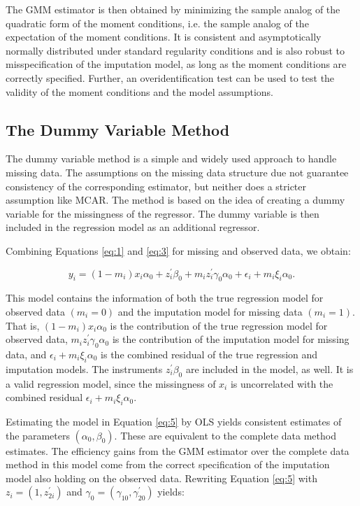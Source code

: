 The GMM estimator is then obtained by minimizing the sample analog of the quadratic form of the moment conditions, i.e. the sample analog of the expectation of the moment conditions.
It is consistent and asymptotically normally distributed under standard regularity conditions and is also robust to misspecification of the imputation model, as long as the moment conditions are correctly specified.
Further, an overidentification test can be used to test the validity of the moment conditions and the model assumptions.

\subsection{The Dummy Variable Method}
\label{subsec:methodology-dummy}
The dummy variable method is a simple and widely used approach to handle missing data.
The assumptions on the missing data structure due not guarantee consistency of the corresponding estimator, but neither does a stricter assumption like MCAR.
The method is based on the idea of creating a dummy variable for the missingness of the regressor.
The dummy variable is then included in the regression model as an additional regressor.

Combining Equations \eqref{eq:1} and \eqref{eq:3} for missing and observed data, we obtain:

\begin{equation}\label{eq:5}
    y_i = (1-m_i) x_i \alpha_0 + z_i^{\prime} \beta_0 + m_i z_i^{\prime} \gamma_0 \alpha_0 + \epsilon_i + m_i \xi_i \alpha_0.
\end{equation}

This model contains the information of both the true regression model for observed data $(m_i = 0)$ and the imputation model for missing data $(m_i = 1)$.
That is, $(1-m_i) x_i \alpha_0$ is the contribution of the true regression model for observed data, $m_i z_i^{\prime} \gamma_0 \alpha_0$ is the contribution of the imputation model for missing data, and
$\epsilon_i + m_i \xi_i \alpha_0$ is the combined residual of the true regression and imputation models.
The instruments $z_i^{\prime} \beta_0$ are included in the model, as well.
It is a valid regression model, since the missingness of $x_i$ is uncorrelated with the combined residual $\epsilon_i + m_i \xi_i \alpha_0$.

Estimating the model in Equation \eqref{eq:5} by OLS yields consistent estimates of the parameters $(\alpha_0, \beta_0)$.
These are equivalent to the complete data method estimates.
The efficiency gains from the GMM estimator over the complete data method in this model come from the correct specification of the imputation model also holding on the observed data.
Rewriting Equation \eqref{eq:5} with $z_i = (1, z_{2i}^{\prime})$ and $\gamma_0 = (\gamma_{10}, \gamma_{20}^{\prime})$ yields:


